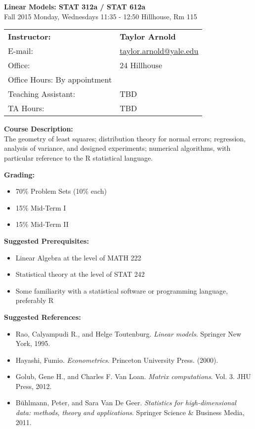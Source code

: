\documentclass[12pt]{article}
\begin{document}
\begin{center}
{\bf Linear Models: STAT 312a / STAT 612a} \\
Fall 2015 \quad Monday, Wednesdays 11:35 - 12:50  Hillhouse, Rm 115
\end{center}

\bigskip

\noindent
\begin{tabular}{ l l }
{\bf Instructor:} &  {\bf Taylor Arnold} \\
E-mail: & \href{mailto:taylor.arnold@yale.edu}{taylor.arnold@yale.edu} \\
Office: & 24 Hillhouse \\
Office Hours: By appointment \\
Teaching Assistant: & TBD \\
TA Hours: & TBD
\end{tabular}

\vspace{1cm}

{\bf Course Description:} \\
The geometry of least squares; distribution theory for normal errors; regression, analysis of variance, and designed experiments; numerical algorithms, with particular reference to the R statistical language.

\vspace{0.5cm}

{\bf Grading:}
\begin{itemize}\setlength\itemsep{0em}
\item 70\% Problem Sets (10\% each)
\item 15\% Mid-Term I
\item 15\% Mid-Term II
\end{itemize}

\vspace{0.5cm}

{\bf Suggested Prerequisites:}
\begin{itemize}\setlength\itemsep{0em}
\item Linear Algebra at the level of MATH 222
\item Statistical theory at the level of STAT 242
\item Some familiarity with a statistical software or programming language, preferably R
\end{itemize}

\vspace{0.5cm}

{\bf Suggested References:}
\begin{itemize}\setlength\itemsep{0em}
\item Rao, Calyampudi R., and Helge Toutenburg. {\it Linear models}. Springer New York, 1995.
\item Hayashi, Fumio. {\it Econometrics}. Princeton University Press. (2000).
\item Golub, Gene H., and Charles F. Van Loan. {\it Matrix computations}. Vol. 3. JHU Press, 2012.
\item Bühlmann, Peter, and Sara Van De Geer. {\it Statistics for high-dimensional data: methods, theory and applications}. Springer Science \& Business Media, 2011.
\end{itemize}
\end{document}
